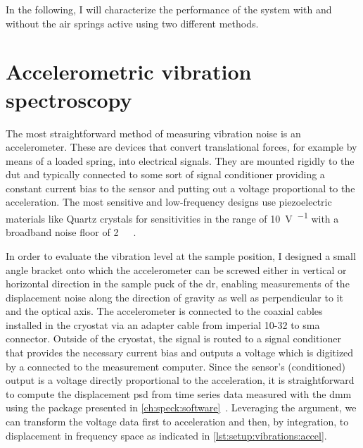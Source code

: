 In the following, I will characterize the performance of the system with and without the air springs active using two different methods.

\section{Accelerometric vibration spectroscopy}\label{sec:setup:vibrations:accel}
The most straightforward method of measuring vibration noise is an accelerometer.
These are devices that convert translational forces, for example by means of a loaded spring, into electrical signals.
They are mounted rigidly to the \gls{dut} and typically connected to some sort of signal conditioner providing a constant current bias to the sensor and putting out a voltage proportional to the acceleration.
The most sensitive and low-frequency designs use piezoelectric materials like Quartz crystals for sensitivities in the range of \qty{10}{\volt\per\gaccel} with a broadband noise floor of \qty{2}{\micro\gaccel}~\cite{WilcoxonAccel}.

In order to evaluate the vibration level at the sample position, I designed a small angle bracket onto which the accelerometer
can be screwed either in vertical or horizontal direction in the sample puck of the \gls{dr}, enabling measurements of the displacement noise along the direction of gravity as well as perpendicular to it and the optical axis.
The accelerometer is connected to the coaxial cables installed in the cryostat via an adapter cable from imperial 10-32 to \gls{sma} connector.
Outside of the cryostat, the signal is routed to a signal conditioner that provides the necessary current bias and outputs a voltage which is digitized by a \dmm connected to the measurement computer.
Since the sensor's (conditioned) output is a voltage directly proportional to the acceleration, it is straightforward to compute the displacement \gls{psd} from time series data measured with the \gls{dmm} using the \pyspeck package presented in \cref{ch:speck:software}~\cite{Hangleiter_pyspeck}.
Leveraging the  argument, we can transform the voltage data first to acceleration and then, by integration, to displacement in frequency space as indicated in \cref{lst:setup:vibrations:accel}.

